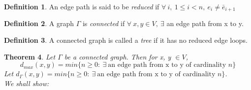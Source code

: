 \documentclass[a4paper,10pt]{book}
\newtheorem{theorem}{Theorem}[chapter]
\theoremstyle{definition}
\newtheorem{definition}[theorem]{Definition}
\theoremstyle{remark}
\numberwithin{section}{chapter}
\numberwithin{equation}{chapter}
\begin{document}
  \begin{definition}
   An edge path is said to be \emph{reduced} if $\forall\ i,\ 1\leq i<n,\ e_i \neq \bar{e}_{i+1}$
  \end{definition}
  \begin{definition}
   A graph $\Gamma$ is \emph{connected} if $\forall\ x,y \in V,\ \exists$ an edge path from x to y.
  \end{definition}
  \begin{definition}
   A connected graph is called a \emph{tree} if it has no reduced edge loops.
  \end{definition}
  \begin{theorem}
   Let $\Gamma$ be a connected graph. Then for x, y $\in V$,
   \begin{equation}
    d_{max}(x,y)=min\{n\geq 0 :\ \exists\ \text{an edge path from x to y of cardinality }n\}
   \end{equation}
  \proof
  Let $d_{\Gamma}(x,y)=min\{n\geq 0 :\ \exists\ \text{an edge path from x to y of cardinality }n\}$.\\
  We shall show:
  \begin{enumerate}
  

\end{enumerate}
\end{theorem}
\end{document}
